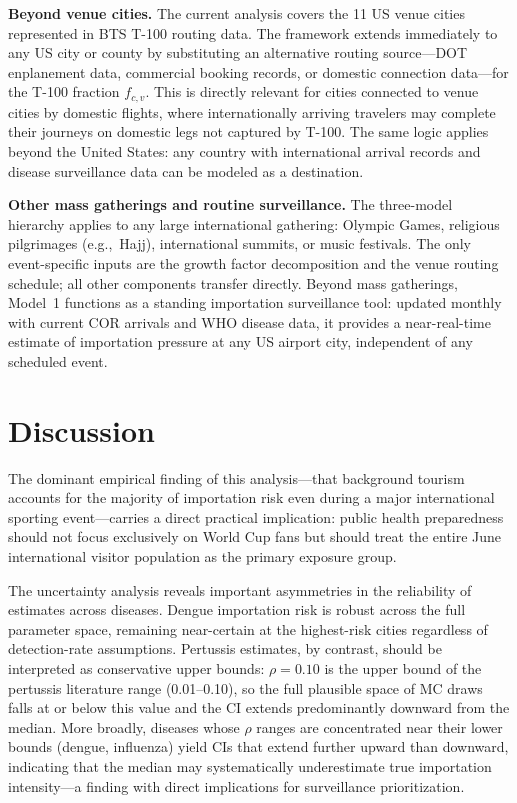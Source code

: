 \documentclass[12pt]{article}
\begin{document}
\textbf{Beyond venue cities.}
The current analysis covers the 11 US venue cities represented in
BTS T-100 routing data. The framework extends immediately to any
US city or county by substituting an alternative routing
source---DOT enplanement data, commercial booking records, or
domestic connection data---for the T-100 fraction $f_{c,v}$.
This is directly relevant for cities connected to venue cities by
domestic flights, where internationally arriving travelers may
complete their journeys on domestic legs not captured by T-100. The
same logic applies beyond the United States: any country with
international arrival records and disease surveillance data can be
modeled as a destination.

\textbf{Other mass gatherings and routine surveillance.}
The three-model hierarchy applies to any large international
gathering: Olympic Games, religious pilgrimages (e.g.,\ Hajj),
international summits, or music festivals. The only event-specific
inputs are the growth factor decomposition and the venue routing
schedule; all other components transfer directly. Beyond mass
gatherings, Model~1 functions as a standing importation surveillance
tool: updated monthly with current COR arrivals and WHO disease
data, it provides a near-real-time estimate of importation pressure
at any US airport city, independent of any scheduled event.

\section*{Discussion}

The dominant empirical finding of this analysis---that background tourism
accounts for the majority of importation risk even during a major
international sporting event---carries a direct practical implication:
public health preparedness should not focus exclusively on World Cup fans
but should treat the entire June international visitor population as the
primary exposure group.

The uncertainty analysis reveals important asymmetries in the reliability of
estimates across diseases. Dengue importation risk is robust across the full
parameter space, remaining near-certain at the highest-risk cities regardless
of detection-rate assumptions. Pertussis estimates, by contrast, should be
interpreted as conservative upper bounds: $\rho = 0.10$ is the upper bound
of the pertussis literature range (0.01--0.10), so the full plausible space
of MC draws falls at or below this value and the CI extends predominantly
downward from the median. More broadly, diseases whose $\rho$ ranges are
concentrated near their lower bounds (dengue, influenza) yield CIs that
extend further upward than downward, indicating that the median may
systematically underestimate true importation intensity---a finding with
direct implications for surveillance prioritization.
\end{document}
